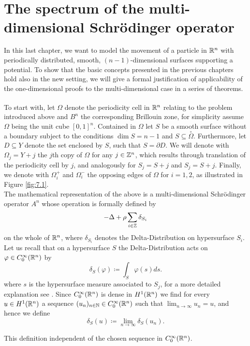 \chapter{The spectrum of the multi-dimensional Schrödinger operator}  \label{chap:7} 

In this last chapter, we want to model the movement of a particle in $\mathbb{R}^{n}$ with periodically distributed, smooth, $(n-1)$-dimensional surfaces supporting a potential. To show that the basic concepts presented in the previous chapters hold also in the new setting, we will give a formal justification of applicability of the one-dimensional proofs to the multi-dimensional case in a series of theorems.
~\\

To start with, let $\Omega$ denote the periodicity cell in $\mathbb{R}^{n}$ relating to the problem introduced above and $B^{n}$ the corresponding Brillouin zone, for simplicity assume $\Omega$ being the unit cube $[0, 1]^{n}$. Contained in $\Omega$ let $S$ be a smooth surface without a boundary subject to the conditions $\dim S = n - 1$ and $S \subseteq \overset{\circ}{\Omega}$. Furthermore, let $D \subseteq Y$ denote the set enclosed by $S$, such that $S = \partial D$. We will denote with $\Omega_{j} = Y + j$ the $j$th copy of $\Omega$ for any $j \in \mathbb{Z}^{n}$, which results through translation of the periodicity cell by $j$, and analogously for $S_{j} = S + j$ and $S_{j} = S + j$. Finally, we denote with $\Omega_{i}^{+}$ and $\Omega_{i}^{-}$ the opposing edges of $\Omega$ for $i = 1, 2$, as illustrated in Figure \ref{fig:7.1}.
~\\

The mathematical representation of the above is a multi-dimensional Schrödinger operator $A^{n}$ whose operation is formally defined by
\begin{equation}
	- \Delta + \rho \sum_{i \in \mathbb{Z}} \delta_{S_{i}} \label{eq:7.1-md_the_operator_A_formallyy}
\end{equation}
on the whole of $\mathbb{R}^{n}$, where $\delta_{S_{i}}$ denotes the Delta-Distribution on hypersurface $S_{i}$. Let us recall that on a hypersurface $S$ the Delta-Distribution acts on $\varphi \in C_{0}^{\infty}(\mathbb{R}^{n})$ by 
	\[ \delta_{S}\left(\varphi\right) \coloneqq \int_{S} \varphi(s) ds . \]
where $s$ is the hypersurface measure associated to $S_{j}$, for a more detailed explanation see \cite[Chapter 14]{forster2012analysis}. Since $C_{0}^{\infty}(\mathbb{R}^{n})$ is dense in $H^{1}(\mathbb{R}^{n})$ we find for every $u \in H^{1}(\mathbb{R}^{n})$ a sequence $(u_{n})_{n \in \mathbb{N}} \in C_{0}^{\infty}(\mathbb{R}^{n})$ such that $\lim_{n \rightarrow \infty} u_{n} = u$, and hence we define
	\[ \delta_{S}\left(u\right) \coloneqq \lim_{n \rightarrow \infty} \delta_{S}\left(u_{n}\right) . \]
\begin{remark}
	This definition independent of the chosen sequence in $C_{0}^{\infty}(\mathbb{R}^{n})$.
\end{remark}

